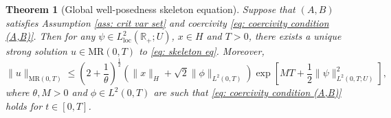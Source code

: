 \documentclass{amsart}
\renewcommand{\MR}{\mathrm{MR}}
\newcommand{\<}{\langle}
\newcommand{\?}{\rangle}
\theoremstyle{plain}
\newtheorem{theorem}{Theorem}[section]
\theoremstyle{remark}
\theoremstyle{plain}
\numberwithin{equation}{section}
\def\R{{\mathbb R}}
\begin{document}
\begin{theorem}[Global well-posedness skeleton equation]\label{th: global well posedness skeleton}
Suppose that $(A,B)$ satisfies Assumption \ref{ass: crit var set} and coercivity \eqref{eq: coercivity condition (A,B)}.
Then for any $\psi \in L_{\mathrm{loc}}^2(\R_+;U)$, $x\in H$ and $T>0$, there exists a unique strong solution $u\in\MR(0,T)$ to \eqref{eq: skeleton eq}. Moreover,
\begin{equation}\label{eq: MR estimate global sol}
  \|u\|_{\MR(0,T)}\leq (2+\frac{1}{\theta})^{\frac{1}{2}}\left(\|x\|_H+\sqrt{2}\|\phi\|_{L^2(0,T)} \right)\exp[ MT+\frac{1}{2}\|\psi\|_{L^2(0,T;U)}^2],
\end{equation}
where $\theta, M>0$ and $\phi\in L^2(0,T)$ are such that \eqref{eq: coercivity condition (A,B)} holds for $t\in[0,T]$.
\end{theorem}
\end{document}
